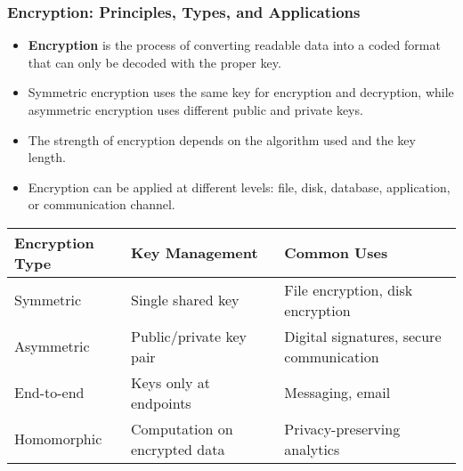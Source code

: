 \documentclass{beamer}
\begin{document}
\begin{frame}
\frametitle{Encryption: Principles, Types, and Applications}
\begin{itemize}
\item \textbf{Encryption} is the process of converting readable data into a coded format that can only be decoded with the proper key.
\item Symmetric encryption uses the same key for encryption and decryption, while asymmetric encryption uses different public and private keys.
\item The strength of encryption depends on the algorithm used and the key length.
\item Encryption can be applied at different levels: file, disk, database, application, or communication channel.
\end{itemize}

\scriptsize

\begin{table}
\begin{tabular}{|l|l|l|}
\hline
\textbf{Encryption Type} & \textbf{Key Management} & \textbf{Common Uses} \\
\hline
Symmetric & Single shared key & File encryption, disk encryption \\
\hline
Asymmetric & Public/private key pair & Digital signatures, secure communication \\
\hline
End-to-end & Keys only at endpoints & Messaging, email \\
\hline
Homomorphic & Computation on encrypted data & Privacy-preserving analytics \\
\hline
\end{tabular}
\end{table}
\end{frame}
\end{document}
